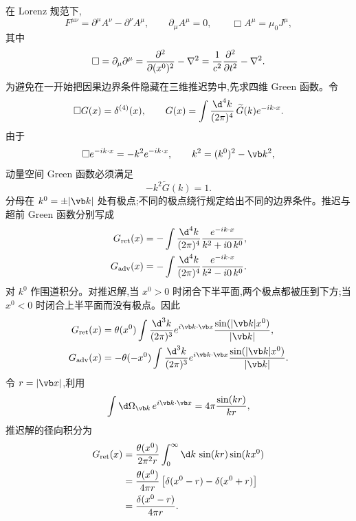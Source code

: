 在 Lorenz 规范下,
\begin{equation*}
 F^{\mu\nu}=\partial^\mu A^\nu-\partial^\nu A^\mu,
 \qquad
 \partial_\mu A^\mu=0,
 \qquad
 \Box A^\mu=\mu_0J^\mu,
\end{equation*}
其中
\begin{equation*}
 \Box=\partial_\mu\partial^\mu
 ={\partial^2\over\partial(x^0)^2}-\nabla^2
 ={1\over c^2}{\partial^2\over\partial t^2}-\nabla^2.
\end{equation*}
为避免在一开始把因果边界条件隐藏在三维推迟势中,先求四维 Green 函数。令
\begin{equation*}
 \Box G(x)=\delta^{(4)}(x),
 \qquad
 G(x)=\int{\d^4k\over(2\pi)^4}\,\widetilde G(k)e^{-ik\cdot x}.
\end{equation*}
由于
\begin{equation*}
 \Box e^{-ik\cdot x}=-k^2e^{-ik\cdot x},
 \qquad
 k^2=(k^0)^2-\vb k^2,
\end{equation*}
动量空间 Green 函数必须满足
\begin{equation*}
 -k^2\widetilde G(k)=1.
\end{equation*}
分母在 $k^0=\pm|\vb k|$ 处有极点;不同的极点绕行规定给出不同的边界条件。推迟与超前 Green 函数分别写成
\begin{align*}
 G_{\mathrm{ret}}(x)
 &=-\int{\d^4k\over(2\pi)^4}
 {e^{-ik\cdot x}\over k^2+i0\,k^0},\\
 G_{\mathrm{adv}}(x)
 &=-\int{\d^4k\over(2\pi)^4}
 {e^{-ik\cdot x}\over k^2-i0\,k^0}.
\end{align*}
对 $k^0$ 作围道积分。对推迟解,当 $x^0>0$ 时闭合下半平面,两个极点都被压到下方;当 $x^0<0$ 时闭合上半平面而没有极点。因此
\begin{align*}
 G_{\mathrm{ret}}(x)
 &=\theta(x^0)
 \int{\d^3k\over(2\pi)^3}
 e^{i\vb k\cdot\vb x}
 {\sin(|\vb k|x^0)\over|\vb k|},\\
 G_{\mathrm{adv}}(x)
 &=-\theta(-x^0)
 \int{\d^3k\over(2\pi)^3}
 e^{i\vb k\cdot\vb x}
 {\sin(|\vb k|x^0)\over|\vb k|}.
\end{align*}
令 $r=|\vb x|$,利用
\begin{equation*}
 \int\d\Omega_{\vb k}\,e^{i\vb k\cdot\vb x}
 =4\pi{\sin(kr)\over kr},
\end{equation*}
推迟解的径向积分为
\begin{align*}
 G_{\mathrm{ret}}(x)
 &= {\theta(x^0)\over2\pi^2r}
 \int_0^\infty\d k\,\sin(kr)\sin(kx^0)\\
 &= {\theta(x^0)\over4\pi r}
 \left[\delta(x^0-r)-\delta(x^0+r)\right]\\
 &= {\delta(x^0-r)\over4\pi r}.
\end{align*}
